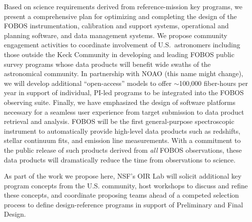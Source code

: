 \documentclass[oneside,11pt]{amsart}
\begin{document}
Based on science requirements derived from reference-mission key programs, we present a comprehensive plan for optimizing and completing the design of the FOBOS instrumentation, calibration and support systems, operational and planning software, and data management systems.  We propose community engagement activities to coordinate involvement of U.S.~astronomers including those outside the Keck Community in developing and leading FOBOS public survey programs whose data products will benefit wide swaths of the astronomical community.  In partnership with NOAO (this name might change), we will develop additional ``open-access'' models to offer $\sim$100,000 fiber-hours per year in support of individual, PI-led programs to be integrated into the FOBOS observing suite.  Finally, we have emphasized the design of software platforms necessary for a seamless user experience from target submission to data product retrieval and analysis.  FOBOS will be the first general-purpose spectroscopic instrument to automatically provide high-level data products such as redshifts, stellar continuum fits, and emission line measurements.  With a commitment to the public release of such products derived from \emph{all} FOBOS observations, these data products will dramatically reduce the time from observations to science.

As part of the work we propose here, NSF's OIR Lab will solicit additional key program concepts from the U.S. community, host workshops to discuss and refine these concepts, and coordinate proposing teams ahead of a competed selection process to define design-reference programs in support of Preliminary and Final Design.


\end{document}
